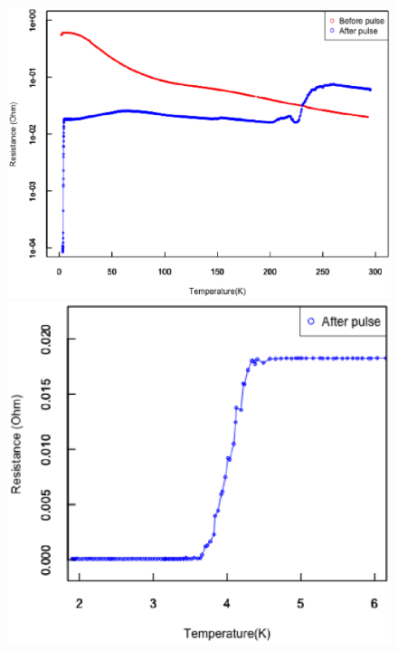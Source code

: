 \begin{figure}[!h]
 \begin{minipage}{\hsize}
    \begin{center}
   \includegraphics[width=0.8\hsize]{results_discussions/181228_before_after_pulse_log.eps}
  \end{center}
  \caption{}
  \label{fig:181228_before_after_pulse_log}
   \end{minipage}
 \begin{minipage}{0.5\hsize}
    \begin{center}
   \includegraphics[width=\hsize]{results_discussions/181228_after_pulse.eps}
  \end{center}
  \caption{}
  \label{fig:181228_after_pulse}
 \end{minipage}
\end{figure}
 


